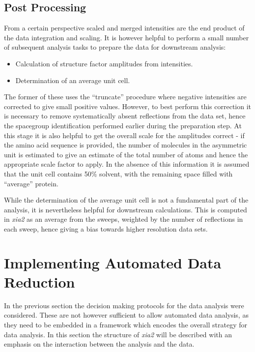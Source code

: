 \documentclass[preprint,pdf]{iucr}
\begin{document}
\subsection{Post Processing}

From a certain perspective scaled and merged intensities are the end
product of the data integration and scaling. It is however helpful to
perform a small number of subsequent analysis tasks to prepare the
data for downstream analysis:

\begin{itemize}
\item{Calculation of structure factor amplitudes from intensities.}
\item{Determination of an average unit cell.}
\end{itemize}

\noindent
The former of these uses the ``truncate'' procedure \cite{French:a15572}
where negative intensities are corrected to give small positive
values. However, to best perform this correction it is necessary to
remove systematically absent reflections from the data set, hence the
spacegroup identification performed earlier during the preparation
step. At this stage it is also helpful to get the overall scale for
the amplitudes correct - if the amino acid sequence is provided, the
number of molecules in the asymmetric unit is estimated \cite{KantardjieffRupp}
to give an estimate of the total number of atoms
and hence the appropriate scale factor to apply. In the absence of
this information it is assumed that the unit cell contains 50\%
solvent, with the remaining space filled with ``average'' protein. 

While the determination of the average unit cell is not a fundamental
part of the analysis, it is nevertheless helpful for downstream
calculations. This is computed in \emph{xia2} as an average from the
sweeps, weighted by the number of reflections in each sweep, hence
giving a bias towards higher resolution data sets.

\section{Implementing Automated Data Reduction}

In the previous section the decision making protocols for the data
analysis were considered. These are not however sufficient to allow
automated data analysis, as they need to be embedded in a framework
which encodes the overall strategy for data analysis. In this section
the structure of \emph{xia2} will be described with an emphasis on the
interaction between the analysis and the data.
\end{document}
